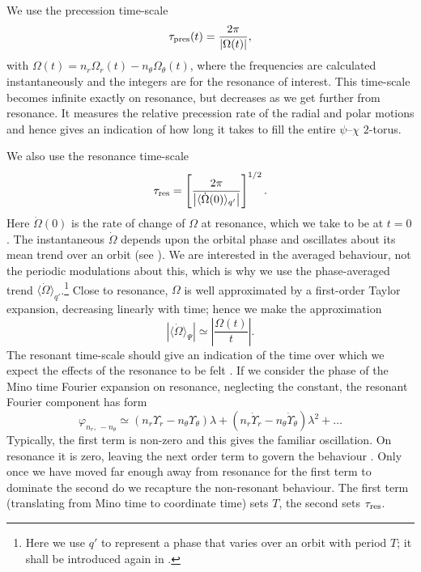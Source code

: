 We use the precession time-scale
\begin{equation}
\tau_\mathrm{pres}(t) = \dfrac{2\pi}{|\Omega(t)|},
\label{eq:t-pres}
\end{equation}
with $\Omega(t) = n_r \Omega_r(t) - n_\theta \Omega_\theta(t)$, where the frequencies are calculated instantaneously and the integers are for the resonance of interest. This time-scale becomes infinite exactly on resonance, but decreases as we get further from resonance. It measures the relative precession rate of the radial and polar motions and hence gives an indication of how long it takes to fill the entire $\psi$--$\chi$ $2$-torus.

We also use the resonance time-scale
\begin{equation}
\tau_\mathrm{res} = \left[\dfrac{2\pi}{\left|\langle\dot{\Omega}(0)\rangle_{q'}\right|}\right]^{1/2}.
\label{eq:t-res}
\end{equation}
Here $\dot{\Omega}(0)$ is the rate of change of $\Omega$ at resonance, which we take to be at $t = 0$. The instantaneous $\dot{\Omega}$ depends upon the orbital phase and oscillates about its mean trend over an orbit (see ). We are interested in the averaged behaviour, not the periodic modulations about this, which is why we use the phase-averaged trend $\langle\dot{\Omega}\rangle_{q'}$.\footnote{Here we use $q'$ to represent a phase that varies over an orbit with period $T$; it shall be introduced again in .} Close to resonance, $\Omega$ is well approximated by a first-order Taylor expansion, decreasing linearly with time; hence we make the approximation
\begin{equation}
\left|\langle\dot{\Omega}\rangle_\Psi\right| \simeq \left|\dfrac{\Omega(t)}{t}\right|.
\end{equation}
The resonant time-scale should give an indication of the time over which we expect the effects of the resonance to be felt \citep{Bosley1992}. If we consider the phase of the Mino time Fourier expansion on resonance, neglecting the constant, the resonant Fourier component has form
\begin{equation}
\varphi_{n_r,\,-n_\theta} \simeq \left(n_r\Upsilon_r - n_\theta\Upsilon_\theta\right)\lambda + \left(n_r\dot{\Upsilon}_r - n_\theta\dot{\Upsilon}_\theta\right)\lambda^2 + \ldots
\end{equation}
Typically, the first term is non-zero and this gives the familiar oscillation. On resonance it is zero, leaving the next order term to govern the behaviour \citep{Flanagan2012}. Only once we have moved far enough away from resonance for the first term to dominate the second do we recapture the non-resonant behaviour. The first term (translating from Mino time to coordinate time) sets $T$, the second sets $\tau_\mathrm{res}$.

